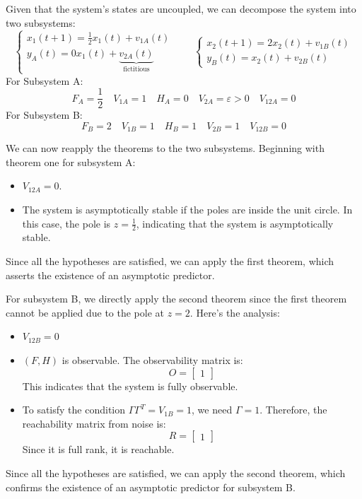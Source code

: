 \begin{enumerate}
        Given that the system's states are uncoupled, we can decompose the system into two subsystems:
        \[\begin{cases}
            x_1(t+1)=\frac{1}{2}x_1(t)+v_{1A}(t) \\
            y_A(t)=0x_1(t)+\underbrace{v_{2A}(t)}_{\text{fictitious}} 
        \end{cases} \qquad
        \begin{cases}
            x_2(t+1)=2x_2(t)+v_{1B}(t) \\
            y_B(t)=x_2(t)+v_{2B}(t)
        \end{cases}\]
        For Subsystem A:
        \[F_A=\frac{1}{2}\quad V_{1A}=1\quad H_A=0 \quad V_{2A}=\varepsilon>0\quad V_{12A}=0\]
        For Subsystem B:
        \[F_B=2 \quad V_{1B}=1\quad H_B=1 \quad V_{2B}=1\quad V_{12B}=0\]

        We can now reapply the theorems to the two subsystems. 
        Beginning with theorem one for subsystem A:
        \begin{itemize}
            \item $V_{12A}=0$. 
            \item The system is asymptotically stable if the poles are inside the unit circle.
                In this case, the pole is $z=\frac{1}{2}$, indicating that the system is asymptotically stable.
        \end{itemize}
        Since all the hypotheses are satisfied, we can apply the first theorem, which asserts the existence of an asymptotic predictor.

        For subsystem B, we directly apply the second theorem since the first theorem cannot be applied due to the pole at $z=2$. 
        Here's the analysis:
        \begin{itemize}
            \item $V_{12B}=0$
            \item $(F,H)$ is observable. 
                The observability matrix is: 
                \[O=\begin{bmatrix} 1 \end{bmatrix}\]
                This indicates that the system is fully observable.
            \item To satisfy the condition $\Gamma\Gamma^T=V_{1B}=1$, we need $\Gamma=1$. 
                Therefore, the reachability matrix from noise is:
                \[R=\begin{bmatrix} 1 \end{bmatrix}\]
                Since it is full rank, it is reachable.
        \end{itemize}
        Since all the hypotheses are satisfied, we can apply the second theorem, which confirms the existence of an asymptotic predictor for subsystem B.


\end{enumerate}
